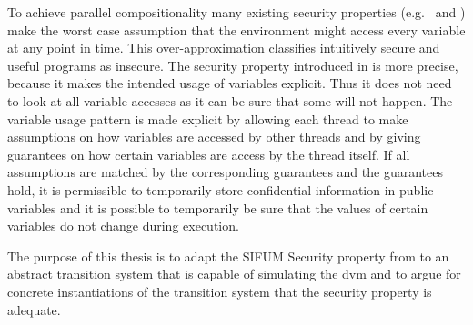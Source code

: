 To achieve parallel compositionality many existing security properties
(e.g.\ \cite{DBLP:conf/csfw/SabelfeldS00} and
\cite{Zdancewic03observationaldeterminism}) make the worst case
assumption that the environment might access every variable at any
point in time. This over-approximation classifies intuitively secure
and useful programs as insecure. The security property introduced in
\cite{mantel.sands.ea:assumptions} is more precise, because it makes
the intended usage of variables explicit. Thus it does not need to
look at all variable accesses as it can be sure that some will not
happen. The variable usage pattern is made explicit by allowing each
thread to make assumptions on how variables are accessed by other
threads and by giving guarantees on how certain variables are access
by the thread itself. If all assumptions are matched by the
corresponding guarantees and the guarantees hold, it is permissible to
temporarily store confidential information in public variables and it
is possible to temporarily be sure that the values of certain
variables do not change during execution.

The purpose of this thesis is to adapt the SIFUM Security property
from \cite{mantel.sands.ea:assumptions} to an abstract transition
system that is capable of simulating the \gls{dvm} and to argue for
concrete instantiations of the transition system that the security
property is adequate.

